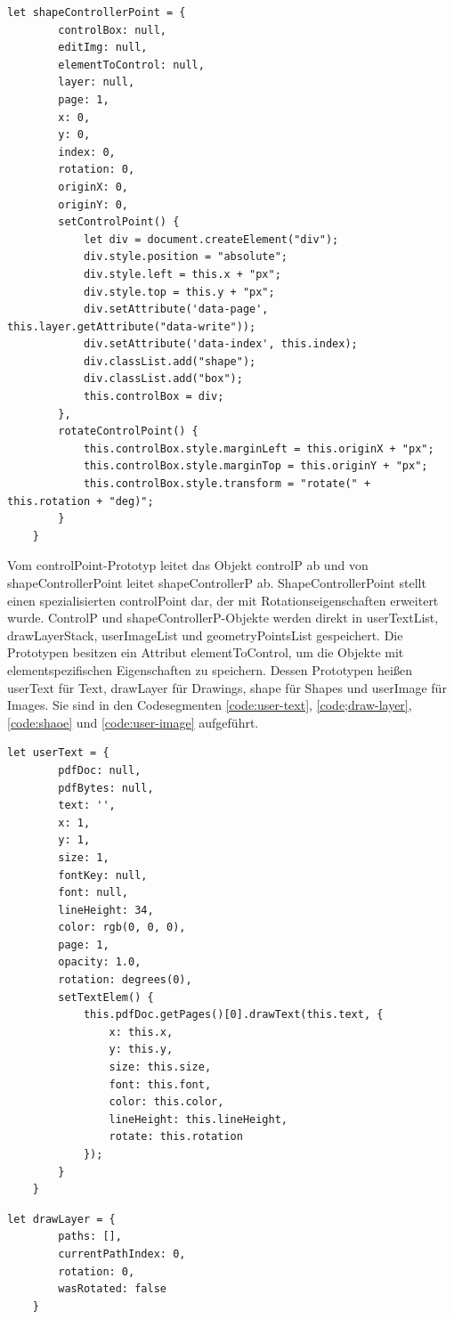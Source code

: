\begin{lstlisting}[style=ES6, caption={Prototyp-Objekt für die Node-Struktur von Shape}, label=code:shape-controller-point, breaklines=true]
	let shapeControllerPoint = {
		controlBox: null,
		editImg: null,
		elementToControl: null,
		layer: null,
		page: 1, 
		x: 0,
		y: 0,
		index: 0, 
		rotation: 0,
		originX: 0,
		originY: 0,
		setControlPoint() {
			let div = document.createElement("div");
			div.style.position = "absolute";
			div.style.left = this.x + "px";
			div.style.top = this.y + "px";
			div.setAttribute('data-page', this.layer.getAttribute("data-write"));
			div.setAttribute('data-index', this.index);
			div.classList.add("shape");
			div.classList.add("box");
			this.controlBox = div;
		},
		rotateControlPoint() {
			this.controlBox.style.marginLeft = this.originX + "px";
			this.controlBox.style.marginTop = this.originY + "px";
			this.controlBox.style.transform = "rotate(" + this.rotation + "deg)";
		}
	}
\end{lstlisting}  

Vom controlPoint-Prototyp leitet das Objekt controlP ab und von shapeControllerPoint leitet shapeControllerP ab. ShapeControllerPoint stellt einen spezialisierten controlPoint dar, der mit Rotationseigenschaften erweitert wurde. ControlP und shapeControllerP-Objekte werden direkt in userTextList, drawLayerStack, userImageList und geometryPointsList gespeichert. Die Prototypen besitzen ein Attribut elementToControl, um die Objekte mit elementspezifischen Eigenschaften zu speichern. Dessen Prototypen heißen userText für Text, drawLayer für Drawings, shape für Shapes und userImage für Images. Sie sind in den Codesegmenten \ref{code:user-text}, \ref{code;draw-layer}, \ref{code:shaoe} und \ref{code:user-image} aufgeführt.

\begin{lstlisting}[style=ES6, caption={Prototyp-Objekt für die textspezifischen Eigenschaften}, label=code:user-text, breaklines=true]
	let userText = {
		pdfDoc: null,
		pdfBytes: null,
		text: '',
		x: 1,
		y: 1,
		size: 1,
		fontKey: null,
		font: null,
		lineHeight: 34,
		color: rgb(0, 0, 0),
		page: 1,
		opacity: 1.0,
		rotation: degrees(0),
		setTextElem() {
			this.pdfDoc.getPages()[0].drawText(this.text, {
				x: this.x,
				y: this.y,
				size: this.size,
				font: this.font,
				color: this.color,
				lineHeight: this.lineHeight,
				rotate: this.rotation
			});
		}
	}
\end{lstlisting}

\begin{lstlisting}[style=ES6, caption={Prototyp-Objekt für die drawingspezifischen Eigenschaften}, label=code:draw-layer, breaklines=true]
	let drawLayer = {
		paths: [],
		currentPathIndex: 0, 
		rotation: 0,
		wasRotated: false
	}
\end{lstlisting}

